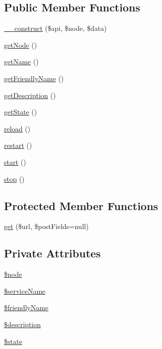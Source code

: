 \subsection*{Public Member Functions}
\begin{DoxyCompactItemize}
\item 
\hyperlink{class_proxmox_node_service_adfcfa6b049f464e61bd938ae271cec8f}{\+\_\+\+\_\+construct} (\$api, \$node, \$data)
\item 
\hyperlink{class_proxmox_node_service_a3a0d17930cbcc57bef84064afcc1a837}{get\+Node} ()
\item 
\hyperlink{class_proxmox_node_service_a3d0963e68bb313b163a73f2803c64600}{get\+Name} ()
\item 
\hyperlink{class_proxmox_node_service_ae09f432e51653377556550a5a4d983b9}{get\+Friendly\+Name} ()
\item 
\hyperlink{class_proxmox_node_service_a2e7bb35c71bf1824456ceb944cb7a845}{get\+Description} ()
\item 
\hyperlink{class_proxmox_node_service_afbf787ced76807989fb3093e1772c5a1}{get\+State} ()
\item 
\hyperlink{class_proxmox_node_service_a7b2a44f6ec87a111c1bc3cc911cd15f5}{reload} ()
\item 
\hyperlink{class_proxmox_node_service_ac8de9e38ce27c87f710dff42a13455cf}{restart} ()
\item 
\hyperlink{class_proxmox_node_service_af8fa59992209e36dccb3eefb0f75531f}{start} ()
\item 
\hyperlink{class_proxmox_node_service_a8b6fc76a620d7557d06e9a11a9ffb509}{stop} ()
\end{DoxyCompactItemize}
\subsection*{Protected Member Functions}
\begin{DoxyCompactItemize}
\item 
\hyperlink{class_proxmox_node_service_a06921d906d966f332513c748b93b86d0}{get} (\$url, \$post\+Fields=null)
\end{DoxyCompactItemize}
\subsection*{Private Attributes}
\begin{DoxyCompactItemize}
\item 
\hyperlink{class_proxmox_node_service_a15955933e72700564e1a76d7f97c1ac7}{\$node}
\item 
\hyperlink{class_proxmox_node_service_a97c69a9ed13f64b5b324f42ae134399c}{\$service\+Name}
\item 
\hyperlink{class_proxmox_node_service_a618c5882cef77e323710156cd421f039}{\$friendly\+Name}
\item 
\hyperlink{class_proxmox_node_service_a87b032cba06009e3467abf1c8018d960}{\$description}
\item 
\hyperlink{class_proxmox_node_service_ae82306c4f2d17d8dd5c7d8d916b33bed}{\$state}
\end{DoxyCompactItemize}
